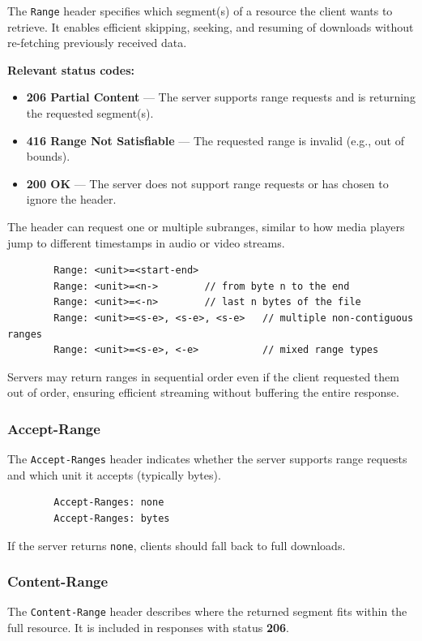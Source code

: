 \documentclass[11pt,a4paper]{article}
\begin{document}
	The \texttt{Range} header specifies which segment(s) of a resource the client wants to retrieve.  
	It enables efficient skipping, seeking, and resuming of downloads without re-fetching previously received data.
	
	\textbf{Relevant status codes:}
	\begin{itemize}
		\item \textbf{206 Partial Content} — The server supports range requests and is returning the requested segment(s).
		\item \textbf{416 Range Not Satisfiable} — The requested range is invalid (e.g., out of bounds).
		\item \textbf{200 OK} — The server does not support range requests or has chosen to ignore the header.
	\end{itemize}
	The header can request one or multiple subranges, similar to how media players jump to different timestamps in audio or video streams.
	
	\begin{lstlisting}
		Range: <unit>=<start-end>
		Range: <unit>=<n->        // from byte n to the end
		Range: <unit>=<-n>        // last n bytes of the file
		Range: <unit>=<s-e>, <s-e>, <s-e>   // multiple non-contiguous ranges
		Range: <unit>=<s-e>, <-e>           // mixed range types
	\end{lstlisting}
	Servers may return ranges in sequential order even if the client requested them out of order, ensuring efficient streaming without buffering the entire response.
	
	\subsubsection{Accept-Range}
	The \texttt{Accept-Ranges} header indicates whether the server supports range requests and which unit it accepts (typically bytes).
	
	\begin{lstlisting}
		Accept-Ranges: none
		Accept-Ranges: bytes
	\end{lstlisting}
	If the server returns \texttt{none}, clients should fall back to full downloads.
	
	\subsubsection{Content-Range}
	The \texttt{Content-Range} header describes where the returned segment fits within the full resource.  
	It is included in responses with status \textbf{206}.
	
\end{document}
